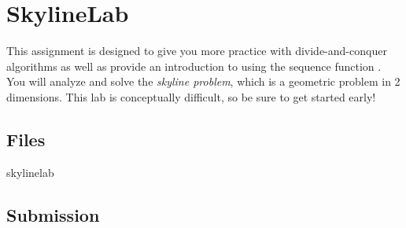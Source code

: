 \chapter{SkylineLab}
\label{ch:skylinelab}

\begin{preamble}
This assignment is designed to give you more practice with divide-and-conquer
algorithms as well as provide an introduction to using the sequence function
. You will analyze and solve the \emph{skyline problem}, which is a
geometric problem in 2 dimensions. This lab is conceptually difficult, so be
sure to get started early!
\end{preamble}

\section{Files}

\begin{gram}
\begin{filesInstructions}{skylinelab}
\end{filesInstructions}
\end{gram}

\section{Submission}
\begin{gram}
\end{gram}

